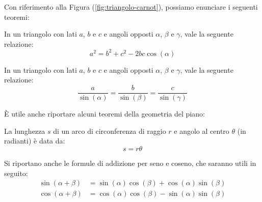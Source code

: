 Con riferimento alla Figura (\ref{fig:triangolo-carnot}), possiamo enunciare i seguenti teoremi:
\begin{theorem}
    In un triangolo con lati $a$, $b$ e $c$ e angoli opposti $\alpha$, $\beta$ e $\gamma$, vale la seguente relazione:
    \begin{equation*}
        a^2 = b^2 + c^2 - 2bc \cos(\alpha)
    \end{equation*}
\end{theorem}

\begin{theorem}
    In un triangolo con lati $a$, $b$ e $c$ e angoli opposti $\alpha$, $\beta$ e $\gamma$, vale la seguente relazione:
    \begin{equation*}
        \frac{a}{\sin(\alpha)} = \frac{b}{\sin(\beta)} = \frac{c}{\sin(\gamma)}
    \end{equation*}
\end{theorem}

È utile anche riportare alcuni teoremi della geometria del piano:

\begin{theorem}
    La lunghezza $s$ di un arco di circonferenza di raggio $r$ e angolo al centro $\theta$ (in radianti) è data da:
    \begin{equation*}
        s = r \theta
    \end{equation*}
\end{theorem}

Si riportano anche le formule di addizione per seno e coseno, che saranno utili in seguito:
\begin{align*}
    \sin(\alpha + \beta) &= \sin(\alpha)\cos(\beta) + \cos(\alpha)\sin(\beta) \\
    \cos(\alpha + \beta) &= \cos(\alpha)\cos(\beta) - \sin(\alpha)\sin(\beta)
\end{align*}